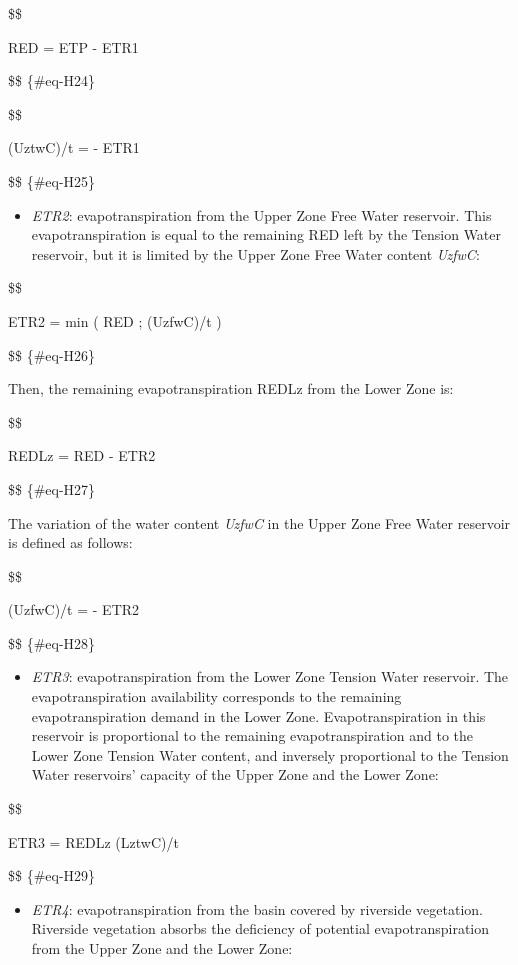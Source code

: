 \documentclass[
  letterpaper,
  DIV=11,
  numbers=noendperiod]{scrreprt}
\providecommand{\tightlist}{%
  \setlength{\itemsep}{0pt}\setlength{\parskip}{0pt}}\usepackage{longtable,booktabs,array}
\begin{document}
\$\$

RED = ETP - ETR1

\$\$ \{\#eq-H24\}

\$\$

(UztwC)/t = - ETR1

\$\$ \{\#eq-H25\}

\begin{itemize}
\tightlist
\item
  \emph{ETR2}: evapotranspiration from the Upper Zone Free Water
  reservoir. This evapotranspiration is equal to the remaining RED left
  by the Tension Water reservoir, but it is limited by the Upper Zone
  Free Water content \emph{UzfwC}:
\end{itemize}

\$\$

ETR2 = min \big( RED ; (UzfwC)/t \big)

\$\$ \{\#eq-H26\}

Then, the remaining evapotranspiration REDLz from the Lower Zone is:

\$\$

REDLz = RED - ETR2

\$\$ \{\#eq-H27\}

The variation of the water content \emph{UzfwC} in the Upper Zone Free
Water reservoir is defined as follows:

\$\$

(UzfwC)/t = - ETR2

\$\$ \{\#eq-H28\}

\begin{itemize}
\tightlist
\item
  \emph{ETR3}: evapotranspiration from the Lower Zone Tension Water
  reservoir. The evapotranspiration availability corresponds to the
  remaining evapotranspiration demand in the Lower Zone.
  Evapotranspiration in this reservoir is proportional to the remaining
  evapotranspiration and to the Lower Zone Tension Water content, and
  inversely proportional to the Tension Water reservoirs' capacity of
  the Upper Zone and the Lower Zone:
\end{itemize}

\$\$

ETR3 = REDLz \cdot {}
\leq {}(LztwC)/t

\$\$ \{\#eq-H29\}

\begin{itemize}
\tightlist
\item
  \emph{ETR4}: evapotranspiration from the basin covered by riverside
  vegetation. Riverside vegetation absorbs the deficiency of potential
  evapotranspiration from the Upper Zone and the Lower Zone:
\end{itemize}
\end{document}
